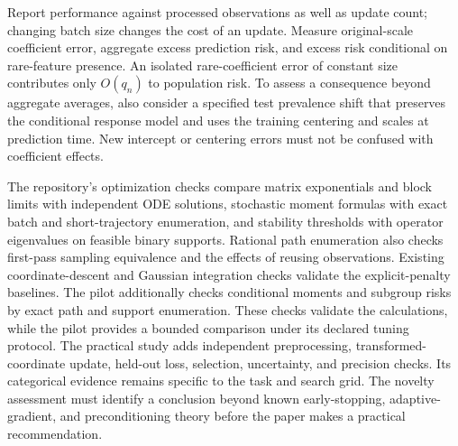 Report performance against processed observations as well as update count;
changing batch size changes the cost of an update. Measure original-scale
coefficient error, aggregate excess prediction risk, and excess risk conditional
on rare-feature presence. An isolated rare-coefficient error of constant size
contributes only $O(q_n)$ to population risk. To assess a consequence beyond
aggregate averages, also consider a specified test prevalence shift that
preserves the conditional response model and uses the training centering and
scales at prediction time. New intercept or centering errors must not be
confused with coefficient effects.

The repository's optimization checks compare matrix exponentials and block
limits with independent ODE solutions, stochastic moment formulas with exact
batch and short-trajectory enumeration, and stability thresholds with operator
eigenvalues on feasible binary supports. Rational path enumeration also checks
first-pass sampling equivalence and the effects of reusing observations.
Existing coordinate-descent and Gaussian integration checks validate the
explicit-penalty baselines. The pilot additionally checks conditional moments
and subgroup risks by exact path and support enumeration. These checks validate
the calculations, while the pilot provides a bounded comparison under its
declared tuning protocol. The practical study adds independent preprocessing,
transformed-coordinate update, held-out loss, selection, uncertainty, and
precision checks. Its categorical evidence remains specific to the task and
search grid. The novelty assessment must identify a conclusion beyond known
early-stopping, adaptive-gradient, and preconditioning theory before the paper
makes a practical recommendation.
